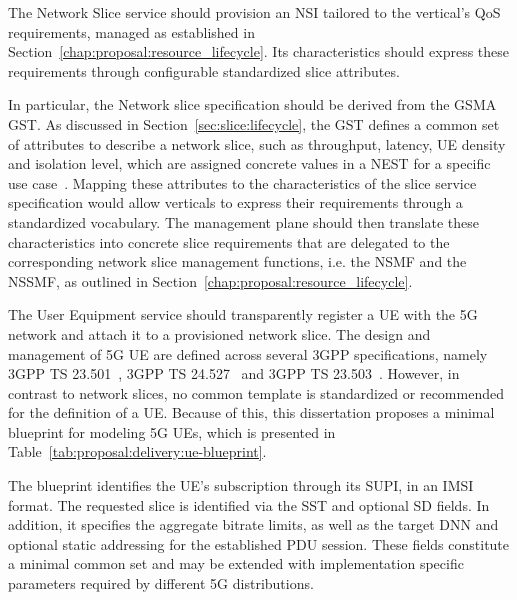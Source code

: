 
The Network Slice service should provision an \acs{NSI} tailored to the vertical's \acs{QoS} requirements, managed as established in Section~\ref{chap:proposal:resource_lifecycle}. Its characteristics should express these requirements through configurable standardized slice attributes.

In particular, the Network slice specification should be derived from the \acs{GSMA} \acs{GST}. As discussed in Section~\ref{sec:slice:lifecycle}, the \acs{GST} defines a common set of attributes to describe a network slice, such as throughput, latency, \acs{UE} density and isolation level, which are assigned concrete values in a \acs{NEST} for a specific use case~\cite{GSMA_GST}. Mapping these attributes to the characteristics of the slice service specification would allow verticals to express their requirements through a standardized vocabulary. The management plane should then translate these characteristics into concrete slice requirements that are delegated to the corresponding network slice management functions, i.e. the \acs{NSMF} and the \acs{NSSMF}, as outlined in Section~\ref{chap:proposal:resource_lifecycle}.



The User Equipment service should transparently register a \acs{UE} with the \acs{5G} network and attach it to a provisioned network slice. The design and management of \acs{5G} \acs{UE} are defined across several \acs{3GPP} specifications, namely \acs{3GPP} TS 23.501~\cite{ETSI_TS_123_501_V16_9_0}, \acs{3GPP} TS 24.527~\cite{ETSI_TS_124_526_V18_6_0} and \acs{3GPP} TS 23.503~\cite{ETSI_TS_123_503_V18_5_0}. However, in contrast to network slices, no common template is standardized or recommended for the definition of a \acs{UE}. Because of this, this dissertation proposes a minimal blueprint for modeling \acs{5G} \acsp{UE}, which is presented in Table~\ref{tab:proposal:delivery:ue-blueprint}.

The blueprint identifies the \acs{UE}'s subscription through its \acs{SUPI}, in an \acs{IMSI} format. The requested slice is identified via the \acs{SST} and optional \acs{SD} fields. In addition, it specifies the aggregate bitrate limits, as well as the target \acs{DNN} and optional static addressing for the established \acs{PDU} session. These fields constitute a minimal common set and may be extended with implementation specific parameters required by different \acs{5G} distributions.

